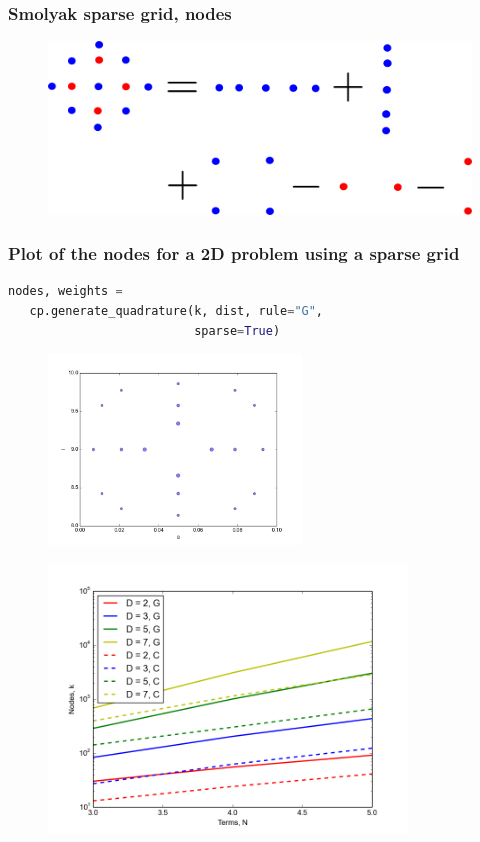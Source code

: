\documentclass{beamer}
\begin{document}
\begin{frame}
 \frametitle{Smolyak sparse grid, nodes}


 \begin{figure}
  \includegraphics[width=\textwidth]{smolyak.png}
 \end{figure}

\end{frame}


\begin{frame}[fragile]
 \frametitle{Plot of the nodes for a 2D problem using a sparse grid}
 \begin{lstlisting}[language=python]
  nodes, weights = 
   cp.generate_quadrature(k, dist, rule="G",
                          sparse=True)
 \end{lstlisting}

 \pause
 \begin{figure}
  \includegraphics[width=0.6\textwidth]{nodes_sparse.png}
 \end{figure}
\end{frame}
 
\begin{frame} 
  \begin{figure}
  \includegraphics[width=0.85\textwidth]{dimensionality_nodes_sparse.png}
 \end{figure}
 \end{frame}
 
\end{document}
